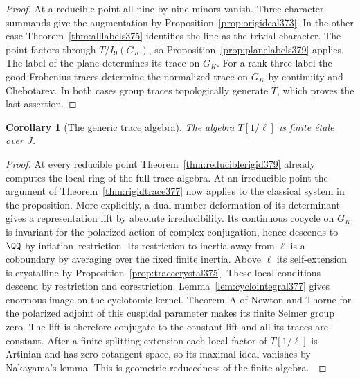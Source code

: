 \documentclass[a4paper,11pt]{article}
\newtheorem{corollary}[proposition]{Corollary}
\theoremstyle{definition}
\theoremstyle{remark}
\numberwithin{equation}{section}
\begin{document}
\begin{proof}
At a reducible point all nine-by-nine minors vanish. Three
character summands give the augmentation by
Proposition~\ref{prop:origideal373}. In the other case
Theorem~\ref{thm:alllabels375} identifies the line as the
trivial character. The point factors through \(T/I_9(G_K)\),
so Proposition~\ref{prop:planelabels379} applies. The label of
the plane determines its trace on \(G_K\). For a rank-three
label the good Frobenius traces determine the normalized trace
on \(G_K\) by continuity and Chebotarev. In both cases group
traces topologically generate \(T\), which proves the last
assertion.
\end{proof}

\begin{corollary}[The generic trace algebra]\leavevmode
\label{cor:originaletale424}
The algebra \(T[1/\ell]\) is finite \'{e}tale over \(J\).
\end{corollary}
\begin{proof}
At every reducible point Theorem~\ref{thm:reduciblerigid379}
already computes the local ring of the full trace algebra.
At an irreducible point the argument of Theorem~\ref{thm:rigidtrace377}
now applies to the classical system in the proposition.
More explicitly, a dual-number deformation of its determinant
gives a representation lift by absolute irreducibility. Its
continuous cocycle on \(G_K\) is invariant for the polarized
action of complex conjugation, hence descends to \(\QQ\)
by inflation--restriction. Its restriction to inertia away
from \(\ell\) is a coboundary by averaging over the fixed
finite inertia. Above \(\ell\) its self-extension is crystalline
by Proposition~\ref{prop:tracecrystal375}. These local conditions
descend by restriction and corestriction. Lemma~\ref{lem:cyclointegral377}
gives enormous image on the cyclotomic kernel. Theorem~A of
Newton and Thorne for the polarized adjoint of this cuspidal
parameter makes its finite Selmer group zero. The lift is
therefore conjugate to the constant lift and all its traces
are constant. After a finite splitting extension each local
factor of \(T[1/\ell]\) is Artinian and has zero cotangent
space, so its maximal ideal vanishes by Nakayama's lemma.
This is geometric reducedness of the finite algebra.~\cite{IX-VII-VI-nt119}
\end{proof}
\end{document}

